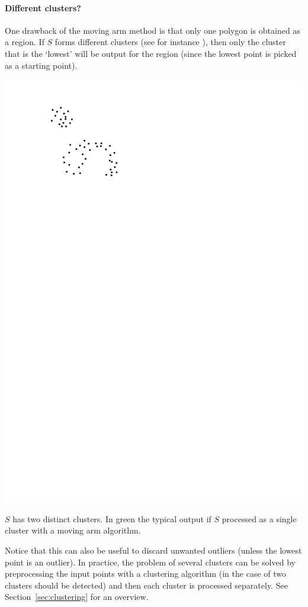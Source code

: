 \paragraph{Different clusters?} 
One drawback of the moving arm method is that only one polygon is obtained as a region.
If $S$ forms different clusters (see for instance ), then only the cluster that is the `lowest' will be output for the region (since the lowest point is picked as a starting point).
\begin{marginfigure}
  \includegraphics[page=2,width=.9\textwidth]{figs/clusters.pdf}
  \caption{$S$ has two distinct clusters. In green the typical output if $S$ processed as a single cluster with a moving arm algorithm.}%
\end{marginfigure}
Notice that this can also be useful to discard unwanted outliers (unless the lowest point is an outlier).
In practice, the problem of several clusters can be solved by preprocessing the input points with a clustering algorithm (in the case of  two clusters should be detected) and then each cluster is processed separately.
See Section~\ref{sec:clustering} for an overview.

